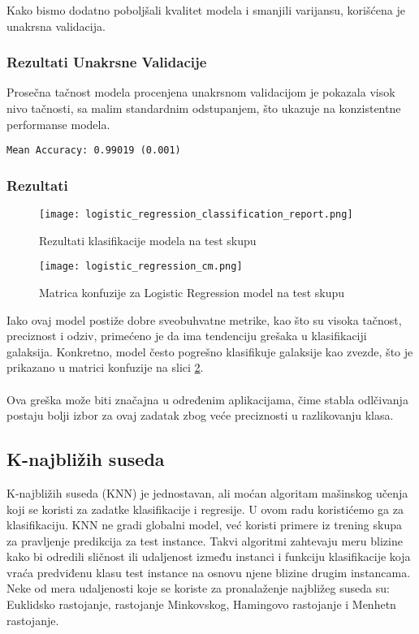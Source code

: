 \documentclass[a4paper,12pt]{article}
\begin{document}
Kako bismo dodatno poboljšali kvalitet modela i smanjili varijansu, korišćena je unakrsna validacija.

\subsubsection{Rezultati Unakrsne Validacije}
Prosečna tačnost modela procenjena unakrsnom validacijom je pokazala visok nivo tačnosti, sa malim standardnim odstupanjem, što ukazuje na konzistentne performanse modela.

\begin{verbatim}
Mean Accuracy: 0.99019 (0.001)
\end{verbatim}

\subsubsection{Rezultati}

\begin{figure}[H]
\centering
\texttt{[image: logistic\_regression\_classification\_report.png]}
\caption{Rezultati klasifikacije modela na test skupu}
\label{fig:logistic_regression_classification_report}
\end{figure}

\begin{figure}[H]
\centering
\texttt{[image: logistic\_regression\_cm.png]}
\caption{Matrica konfuzije za Logistic Regression model na test skupu}
\label{fig:logistic_regression_cm}
\end{figure}

Iako ovaj model postiže dobre sveobuhvatne metrike, kao što su visoka tačnost, preciznost i odziv, primećeno je da ima tendenciju grešaka u klasifikaciji galaksija. Konkretno, model često pogrešno klasifikuje galaksije kao zvezde, što je prikazano u matrici konfuzije na slici \ref{fig:logistic_regression_cm}.\\\\
Ova greška može biti značajna u određenim aplikacijama, čime stabla odlčivanja postaju bolji izbor za ovaj zadatak zbog veće preciznosti u razlikovanju klasa.

\subsection{K-najbližih suseda}

K-najbližih suseda (KNN) je jednostavan, ali moćan algoritam mašinskog učenja koji se koristi za zadatke klasifikacije i regresije. U ovom radu koristićemo ga za klasifikaciju. KNN ne gradi globalni model, već koristi primere iz trening skupa za pravljenje predikcija za test instance. Takvi algoritmi zahtevaju meru blizine kako bi odredili sličnost ili udaljenost između instanci i funkciju klasifikacije koja vraća predviđenu klasu test instance na osnovu njene blizine drugim instancama. Neke od mera udaljenosti koje se koriste za pronalaženje najbližeg suseda su: Euklidsko rastojanje, rastojanje Minkovskog, Hamingovo rastojanje i Menhetn rastojanje.
\end{document}
